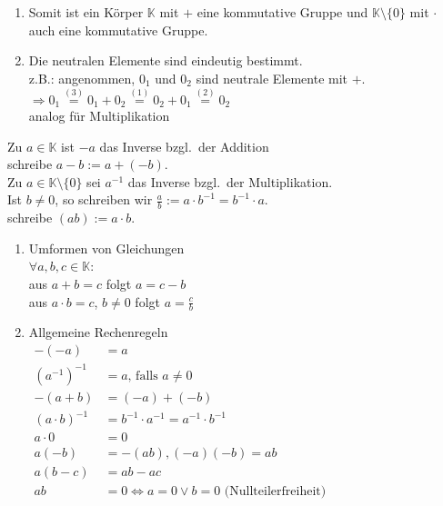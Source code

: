 \documentclass[../ana1.tex]{subfiles}
\begin{document}
\begin{bem}
	\begin{enumerate}\leavevmode
		\item Somit ist ein Körper \(\mathbb{K}\) mit \glqq{}\(+\)\grqq{} eine kommutative Gruppe und \(\mathbb{K} \setminus \{0\} \) mit \glqq{}\( \cdot \)\grqq{} auch eine kommutative Gruppe.
		\item Die neutralen Elemente sind eindeutig bestimmt.\\
		      z.B.: angenommen, \(0_1\) und \(0_2\) sind neutrale Elemente mit \glqq{}\(+\)\grqq{}. \\
		      \(\Rightarrow 0_1 \overset{(3)}{=} 0_1 + 0_2 \overset{(1)}{=} 0_2 + 0_1 \overset{(2)}{=} 0_2\) \\
		      analog für Multiplikation
	\end{enumerate}
\end{bem}
\begin{defi}
	Zu \(a\in \mathbb{K}\) ist \(-a\) das Inverse bzgl.\ der Addition\\
	schreibe \(a-b := a + (-b)\).\\
	Zu \(a\in\mathbb{K}\setminus \{0\} \) sei \( a^{-1} \) das Inverse bzgl.\ der Multiplikation.\\
	Ist \(b\neq 0\), so schreiben wir \(\frac{a}{b} := a\cdot b^{-1} =b^{-1}\cdot a\).\\
	schreibe \((ab) := a\cdot b\).
\end{defi}
\begin{lem}\leavevmode
	\begin{enumerate}
		\item Umformen von Gleichungen\\
		      \(\forall a,b,c\in\mathbb{K}\):\\
		      aus \(a+b=c\) folgt \(a=c-b\) \\
		      aus \(a\cdot b=c\), \(b\neq 0\) folgt \(a=\frac{c}{b}\)
		\item Allgemeine Rechenregeln\\
			\(\begin{aligned}
				-(-a)             & = a                                                               \\
				{(a^{-1})}^{-1}   & =a\text{, falls } a \neq 0                                        \\
				-(a+b)            & = (-a) + (-b)                                                     \\
				{(a\cdot b)}^{-1} & =b^{-1}\cdot a^{-1} = a^{-1}\cdot b^{-1}                          \\
				a\cdot 0          & =0                                                                \\
				a(-b)             & =-(ab), (-a)(-b)=ab                                               \\
				a(b-c)            & = ab - ac                                                         \\
				ab                & = 0 \Leftrightarrow a = 0 \vee b = 0 \text{ (Nullteilerfreiheit)} \\
			\end{aligned}\)
	\end{enumerate}
\end{lem}
\end{document}
